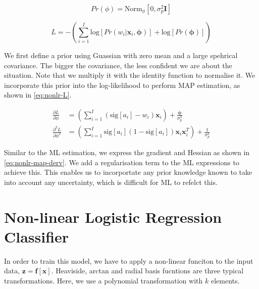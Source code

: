 \documentclass[11pt,openright,a4paper]{article}
\numberwithin{equation}{section}
\begin{document}
\begin{equation} \label{eq:nonlr-prior}
    Pr(\phi) = \text{Norm}_\phi \left [ 0, \sigma_p^2 \mathbf{I} \right ]
\end{equation}

\begin{equation} \label{eq:nonlr-map-L}
    L = - \left ( \sum_{i=1}^{I} \text{log} \left [ Pr \left ( w_i | \mathbf{x}_i, \boldsymbol{\phi} \right ) \right ]
            + \text{log} \left [ Pr \left ( \boldsymbol{\phi} \right ) \right ] \right )
\end{equation}

We first define a prior using Guassian with zero mean and a large spehrical covariance. The bigger the covariance, the less confident we are about the situation. Note that we multiply it with the identity function to normalise it. We incorporate this prior into the log-likelihood to perform MAP estimation, as shown in \autoref{eq:nonlr-L}.

\begin{equation} \label{eq:nonlr-map-derv}
    \begin{aligned}
        \frac{\partial L}{\partial \phi} &= 
            \left ( \sum_{i=1}^{I} \left ( \text{sig} \left [ a_i  \right ] - w_i \right ) 
                \mathbf{x}_i \right ) +
            \frac{\boldsymbol{\phi}}{\sigma_p^2}
        \\
        \frac{\partial^2 L}{\partial \phi^2} &=
            \left ( \sum_{i=1}^{I} \text{sig} \left [ a_i  \right ] 
                \left ( 1 - \text{sig} \left [ a_i  \right ] \right ) 
                \mathbf{x}_i \mathbf{x}_i^{T} \right ) +
                    \frac{1}{\sigma_p^2}
    \end{aligned}
\end{equation}

Similar to the ML estimation, we express the gradient and Hessian as shown in \autoref{eq:nonlr-map-derv}. We add a regularisation term to the ML expressions to achieve this. This enables us to incorportate any prior knowledge known to take into account any uncertainty, which is difficult for ML to refelct this.


\section{Non-linear Logistic Regression Classifier} \label{sec:nonlr}

In order to train this model, we have to apply a non-linear funciton to the input data, $\mathbf{z} = \mathbf{f} [\mathbf{x}]$. Heaviside, arctan and radial basis fucntions are three typical transformations. Here, we use a polynomial transformation with $k$ elements. 
\end{document}
